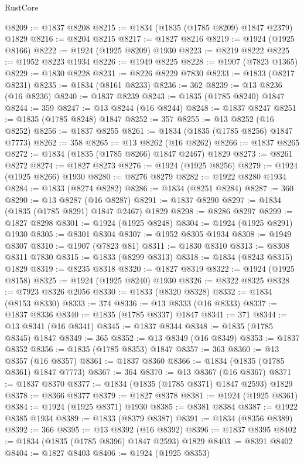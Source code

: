 \begin{lexlean}{RustCore}
\begin{coremodule}
@8209 := @1837 @8208
@8215 := @1834 (@1835 (@1785 @8209) @1847 @2379) @1829
@8216 := @8204 @8215
@8217 := @1827 @8216
@8219 := @1924 (@1925 @8166)
@8222 := @1924 (@1925 @8209) @1930
@8223 := @8219 @8222
@8225 := @1952 @8223 @1934
@8226 := @1949 @8225
@8228 := @1907 (@7823 @1365)
@8229 := @1830 @8228
@8231 := @8226 @8229 @7830
@8233 := @1833 (@8217 @8231)
@8235 := @1834 (@8161 @8233)
@8236 := 362
@8239 := @13 @8236 (@16 @8236)
@8240 := @1837 @8239
@8243 := @1835 (@1785 @8240) @1847
@8244 := 359
@8247 := @13 @8244 (@16 @8244)
@8248 := @1837 @8247
@8251 := @1835 (@1785 @8248) @1847
@8252 := 357
@8255 := @13 @8252 (@16 @8252)
@8256 := @1837 @8255
@8261 := @1834 (@1835 (@1785 @8256) @1847 @7773)
@8262 := 358
@8265 := @13 @8262 (@16 @8262)
@8266 := @1837 @8265
@8272 := @1834 (@1835 (@1785 @8266) @1847 @2467) @1829
@8273 := @8261 @8272
@8274 := @1827 @8273
@8276 := @1924 (@1925 @8256)
@8279 := @1924 (@1925 @8266) @1930
@8280 := @8276 @8279
@8282 := @1922 @8280 @1934
@8284 := @1833 (@8274 @8282)
@8286 := @1834 (@8251 @8284)
@8287 := 360
@8290 := @13 @8287 (@16 @8287)
@8291 := @1837 @8290
@8297 := @1834 (@1835 (@1785 @8291) @1847 @2467) @1829
@8298 := @8286 @8297
@8299 := @1827 @8298
@8301 := @1924 (@1925 @8248)
@8304 := @1924 (@1925 @8291) @1930
@8305 := @8301 @8304
@8307 := @1952 @8305 @1934
@8308 := @1949 @8307
@8310 := @1907 (@7823 @81)
@8311 := @1830 @8310
@8313 := @8308 @8311 @7830
@8315 := @1833 (@8299 @8313)
@8318 := @1834 (@8243 @8315) @1829
@8319 := @8235 @8318
@8320 := @1827 @8319
@8322 := @1924 (@1925 @8158)
@8325 := @1924 (@1925 @8240) @1930
@8326 := @8322 @8325
@8328 := @7923 @8326 @2056
@8330 := @1833 (@8320 @8328)
@8332 := @1834 (@8153 @8330)
@8333 := 374
@8336 := @13 @8333 (@16 @8333)
@8337 := @1837 @8336
@8340 := @1835 (@1785 @8337) @1847
@8341 := 371
@8344 := @13 @8341 (@16 @8341)
@8345 := @1837 @8344
@8348 := @1835 (@1785 @8345) @1847
@8349 := 365
@8352 := @13 @8349 (@16 @8349)
@8353 := @1837 @8352
@8356 := @1835 (@1785 @8353) @1847
@8357 := 363
@8360 := @13 @8357 (@16 @8357)
@8361 := @1837 @8360
@8366 := @1834 (@1835 (@1785 @8361) @1847 @7773)
@8367 := 364
@8370 := @13 @8367 (@16 @8367)
@8371 := @1837 @8370
@8377 := @1834 (@1835 (@1785 @8371) @1847 @2593) @1829
@8378 := @8366 @8377
@8379 := @1827 @8378
@8381 := @1924 (@1925 @8361)
@8384 := @1924 (@1925 @8371) @1930
@8385 := @8381 @8384
@8387 := @1922 @8385 @1934
@8389 := @1833 (@8379 @8387)
@8391 := @1834 (@8356 @8389)
@8392 := 366
@8395 := @13 @8392 (@16 @8392)
@8396 := @1837 @8395
@8402 := @1834 (@1835 (@1785 @8396) @1847 @2593) @1829
@8403 := @8391 @8402
@8404 := @1827 @8403
@8406 := @1924 (@1925 @8353)

\end{coremodule}
\end{lexlean}
